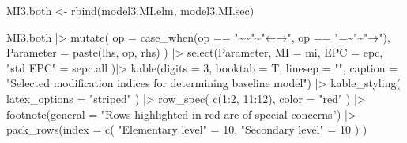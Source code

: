 \documentclass[
]{article}
\newenvironment{Shaded}{\begin{snugshade}}{\end{snugshade}}
\newcommand{\AttributeTok}[1]{\textcolor[rgb]{0.77,0.63,0.00}{#1}}
\newcommand{\DecValTok}[1]{\textcolor[rgb]{0.00,0.00,0.81}{#1}}
\newcommand{\FunctionTok}[1]{\textcolor[rgb]{0.00,0.00,0.00}{#1}}
\newcommand{\NormalTok}[1]{#1}
\newcommand{\OtherTok}[1]{\textcolor[rgb]{0.56,0.35,0.01}{#1}}
\newcommand{\SpecialCharTok}[1]{\textcolor[rgb]{0.00,0.00,0.00}{#1}}
\newcommand{\StringTok}[1]{\textcolor[rgb]{0.31,0.60,0.02}{#1}}
\begin{document}
\begin{Shaded}
\begin{Highlighting}[]
\NormalTok{MI3.both }\OtherTok{\textless{}{-}} \FunctionTok{rbind}\NormalTok{(model3.MI.elm, model3.MI.sec)}

\NormalTok{MI3.both    }\SpecialCharTok{|\textgreater{}} 
  \FunctionTok{mutate}\NormalTok{(}
    \AttributeTok{op =} \FunctionTok{case\_when}\NormalTok{(op }\SpecialCharTok{==} \StringTok{"\textasciitilde{}\textasciitilde{}"}\SpecialCharTok{\textasciitilde{}}\StringTok{"←→"}\NormalTok{,}
\NormalTok{                   op }\SpecialCharTok{==} \StringTok{"=\textasciitilde{}"}\SpecialCharTok{\textasciitilde{}}\StringTok{"→"}\NormalTok{), }
    \AttributeTok{Parameter =} 
           \FunctionTok{paste}\NormalTok{(lhs, op, rhs)}
\NormalTok{         ) }\SpecialCharTok{|\textgreater{}}
  \FunctionTok{select}\NormalTok{(Parameter, }
         \AttributeTok{MI =}\NormalTok{ mi, }
         \AttributeTok{EPC =}\NormalTok{ epc, }
         \StringTok{"std EPC"} \OtherTok{=}\NormalTok{ sepc.all}
\NormalTok{         )}\SpecialCharTok{|\textgreater{}}
  \FunctionTok{kable}\NormalTok{(}\AttributeTok{digits =} \DecValTok{3}\NormalTok{,}
        \AttributeTok{booktab =}\NormalTok{ T,}
        \AttributeTok{linesep =} \StringTok{""}\NormalTok{,}
        \AttributeTok{caption =} 
          \StringTok{"Selected modification indices for determining baseline model"}\NormalTok{) }\SpecialCharTok{|\textgreater{}}
  \FunctionTok{kable\_styling}\NormalTok{(}
    \AttributeTok{latex\_options =} \StringTok{"striped"}
\NormalTok{    ) }\SpecialCharTok{|\textgreater{}}
  \FunctionTok{row\_spec}\NormalTok{(}
    \FunctionTok{c}\NormalTok{(}\DecValTok{1}\SpecialCharTok{:}\DecValTok{2}\NormalTok{, }\DecValTok{11}\SpecialCharTok{:}\DecValTok{12}\NormalTok{), }
    \AttributeTok{color =} \StringTok{"red"}
\NormalTok{    ) }\SpecialCharTok{|\textgreater{}} 
  \FunctionTok{footnote}\NormalTok{(}\AttributeTok{general =} 
             \StringTok{"Rows highlighted in red are of special concerns"}\NormalTok{) }\SpecialCharTok{|\textgreater{}} 
  \FunctionTok{pack\_rows}\NormalTok{(}\AttributeTok{index =} \FunctionTok{c}\NormalTok{(}
    \StringTok{"Elementary level"} \OtherTok{=} \DecValTok{10}\NormalTok{,}
    \StringTok{"Secondary level"} \OtherTok{=} \DecValTok{10}
\NormalTok{    )}
\NormalTok{    )}
\end{Highlighting}
\end{Shaded}
\end{document}
